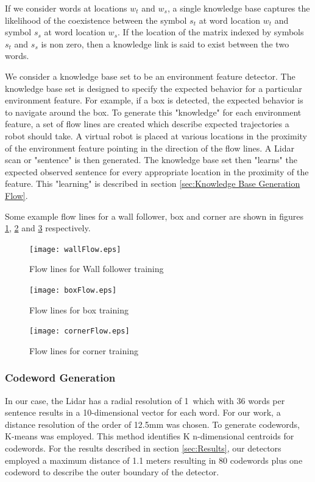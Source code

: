 \documentclass[journal]{IEEEtran}
\begin{document}
If we consider words at locations $w_t$ and $w_s$, a single knowledge base captures the likelihood of the coexistence between the symbol $s_t$
at word location $w_t$ and symbol $s_s$ at word location $w_s$. If the location of the matrix indexed by symbols $s_t$ and $s_s$ is non zero, then a knowledge link
is said to exist between the two words.

We consider a knowledge base set to be an environment feature detector. The knowledge base set is designed to specify the expected
behavior for a particular environment feature. For example, if a box is detected, the expected behavior is to navigate around the box.
To generate this "knowledge" for each environment feature, a set of flow lines are created which describe expected trajectories a robot
should take. A virtual robot is placed at various locations in the proximity of the environment feature pointing in the direction of the flow lines.
A Lidar scan or "sentence" is then generated.
The knowledge base set then "learns" the expected observed sentence for every appropriate location in the proximity of the feature.
This "learning" is described in section \ref{sec:Knowledge Base Generation Flow}.

Some example flow lines for a wall follower, box and corner are shown in figures \ref{fig:Wall Flow}, \ref{fig:Box Flow} and \ref{fig:Corner Flow} respectively.
\begin{figure}[!t]
\centerline{
\mbox{\texttt{[image: wallFlow.eps]}}
}
\caption{Flow lines for Wall follower training}
\label{fig:Wall Flow}
\end{figure}

\begin{figure}[!t]
\centerline{
\mbox{\texttt{[image: boxFlow.eps]}}
}
\caption{Flow lines for box training}
\label{fig:Box Flow}
\end{figure}

\begin{figure}[!t]
\centerline{
\mbox{\texttt{[image: cornerFlow.eps]}}
}
\caption{Flow lines for corner training}
\label{fig:Corner Flow}
\end{figure}

\subsubsection{Codeword Generation}
\label{sec:Codeword Generation}
In our case, the Lidar has a radial resolution of 1\degree~which with 36 words per sentence results in a 10-dimensional vector for each word.
For our work, a distance resolution of the order of 12.5mm was chosen.
To generate codewords, K-means was employed. This method identifies K n-dimensional centroids for codewords.
For the results described in section \ref{sec:Results}, our detectors employed a maximum distance of 1.1 meters
resulting in 80 codewords plus one codeword to describe the outer boundary of the detector.
\end{document}
